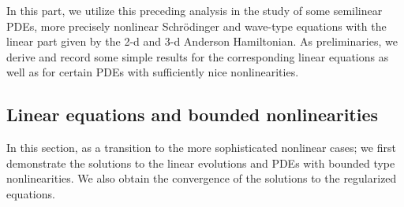\documentclass[11pt, oneside]{article}   	%
\begin{document}
In this part, we utilize this preceding analysis in the study of some semilinear PDEs, more precisely nonlinear Schr\"odinger and wave-type equations with the linear part given by the 2-d and 3-d Anderson Hamiltonian. As preliminaries, we derive and record some simple results for the corresponding linear equations as well as for certain PDEs with sufficiently nice nonlinearities. 
\subsection{Linear equations and bounded nonlinearities}

In this section, as a transition to the more sophisticated nonlinear cases; we first demonstrate the  solutions to the linear evolutions and PDEs with bounded type nonlinearities. We also obtain the convergence of the solutions to the regularized equations.
\end{document}
